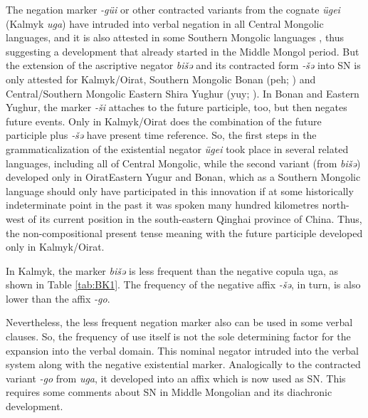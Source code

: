\documentclass[output=paper]{langsci/langscibook}
\begin{document}
The negation marker \textit{-güi} or other contracted variants from the cognate \textit{ügei} (Kalmyk \textit{uga}) have intruded into verbal negation in all Central Mongolic languages, and it is also attested in some Southern Mongolic languages \citep[70-81]{brosig2015a}, thus suggesting a development that already started in the Middle Mongol period. But the extension of the ascriptive negator \textit{bišǝ} and its contracted form \textit{‑šǝ} into SN is only attested for Kalmyk/Oirat, Southern Mongolic Bonan (peh; \citealp{wu2003a}) and Central/Southern Mongolic Eastern Shira Yughur (yuy; \citealp{nugteren2003a}). In Bonan and Eastern Yughur, the marker \textit{-ši} attaches to the future participle, too, but then negates future events. Only in Kalmyk/Oirat does the combination of the future participle plus \textit{‑šǝ} have present time reference. So, the first steps in the grammaticalization of the existential negator \textit{ügei} took place in several related languages, including all of Central Mongolic, while the second variant (from \textit{bišǝ}) developed only in OiratEastern Yugur and Bonan, which as a Southern Mongolic language should only have participated in this innovation if at some historically indeterminate point in the past it was spoken many hundred kilometres north-west of its current position in the south-eastern Qinghai province of China. Thus, the non-compositional present tense meaning with the future participle developed only in Kalmyk/Oirat.

In Kalmyk, the marker \textit{bišǝ} is less frequent than the negative copula uga, as shown in Table \ref{tab:BK1}. The frequency of the negative affix \textit{-šǝ}, in turn, is also lower than the affix \textit{-go}.

\begin{table}[!h]
\caption{Frequency of \textit{bišǝ} and \textit{uga} and negation affixes in the written corpora.}
\label{tab:BK1}
\end{table}

Nevertheless, the less frequent negation marker also can be used in some verbal clauses. So, the frequency of use itself is not the sole determining factor for the expansion into the verbal domain. This nominal negator intruded into the verbal system along with the negative existential marker. Analogically to the contracted variant \textit{-go} from \textit{uga}, it developed into an affix which is now used as SN. This requires some comments about SN in Middle Mongolian and its diachronic development.
\end{document}
